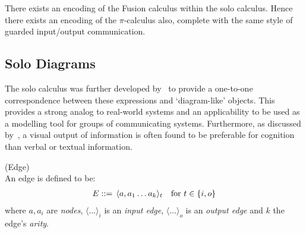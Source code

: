     \begin{remark*}
        There exists an encoding of the Fusion calculus within the solo calculus.
        Hence there exists an encoding of the $\pi$-calculus also, complete with the same style of guarded input/output communication.
    \end{remark*}





\subsection{Solo Diagrams}
    The solo calculus was further developed by~\cite{solo-diagrams} to provide a one-to-one correspondence between these  expressions and `diagram-like' objects.
    This provides a strong analog to real-world systems and an applicability to be used as a modelling tool for groups of communicating systems.
    Furthermore, as discussed by~\cite{learning-styles}, a visual output of information is often found to be preferable for cognition than verbal or textual information.


    \begin{definition}{(Edge)\\}
        An edge is defined to be:
        \begin{align}
            E ::= \, \langle a, a_1 \ldots a_k\rangle_t \quad \text{for } t \in \{ i, o \}
        \end{align}
        where $a, a_i$ are \textit{nodes}, $\langle \ldots \rangle_i$ is an \textit{input edge}, $\langle \ldots \rangle_o$ is an \textit{output edge} and $k$ the edge's \textit{arity}.
    \end{definition}

